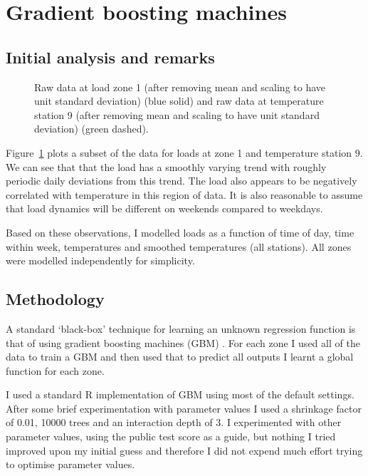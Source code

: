 \section{Gradient boosting machines}

\label{sec:gbm}

\subsection{Initial analysis and remarks}

\label{sec:gbm_init_anal}

\begin{figure}[ht]
  \begin{center}
    
  \end{center}
  \caption[Load data and corresponding temperature data.]{Raw data at load zone 1 (after removing mean and scaling to have unit standard deviation) (blue solid) and raw data at temperature station 9 (after removing mean and scaling to have unit standard deviation) (green dashed).}
  \label{fig:load_temp}
\end{figure}

Figure~\ref{fig:load_temp} plots a subset of the data for loads at zone 1 and temperature station 9.
We can see that that the load has a smoothly varying trend with roughly periodic daily deviations from this trend.
The load also appears to be negatively correlated with temperature in this region of data.
It is also reasonable to assume that load dynamics will be different on weekends compared to weekdays.

Based on these observations, I modelled loads as a function of time of day, time within week, temperatures and smoothed temperatures (all stations).
All zones were modelled independently for simplicity.

\subsection{Methodology}

A standard `black-box' technique for learning an unknown regression function is that of using gradient boosting machines (GBM) \citep[e.g. chapter 10 of][]{Hastie2009-hj}.
For each zone I used all of the data to train a GBM and then used that to predict all outputs \ie I learnt a global function for each zone.

I used a standard R implementation of GBM using most of the default settings\footnotemark.
After some brief experimentation with parameter values I used a shrinkage factor of 0.01, 10000 trees and an interaction depth of 3.
I experimented with other parameter values, using the public test score as a guide, but nothing I tried improved upon my initial guess and therefore I did not expend much effort trying to optimise parameter values.

